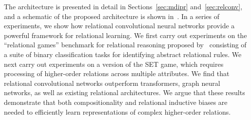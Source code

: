 The architecture is presented in detail in Sections~\ref{sec:mdipr} and~\ref{sec:relconv}, and a schematic of the proposed architecture is shown in~. In a series of experiments, we show how relational convolutional neural networks provide a powerful framework
for relational learning. We first carry out experiments on the ``relational games'' benchmark for relational reasoning proposed by~\citep{shanahanExplicitlyRelationalNeural} consisting of a suite of binary classification tasks for identifying abstract relational rules. 
We next carry out experiments on a version of the SET game, which requires processing of higher-order relations across multiple attributes. We find that relational convolutional networks outperform transformers, graph neural networks, as well as existing relational architectures. We argue that these results demonstrate that both compositionality and relational inductive biases are needed to efficiently learn representations of complex higher-order relations.

